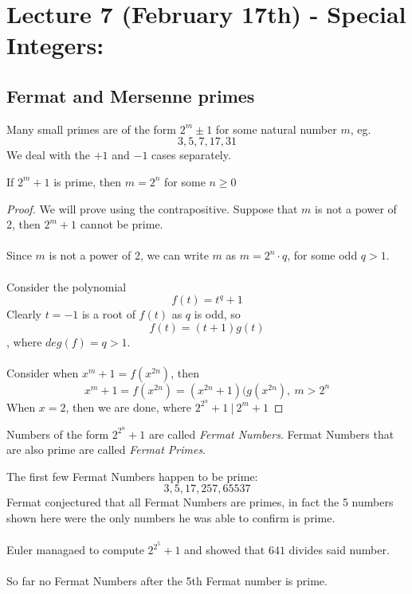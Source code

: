 \section{Lecture 7 (February 17th) - Special Integers:}

\subsection{Fermat and Mersenne primes}
\begin{example}
Many small primes are of the form $2^m \pm 1$ for some natural number $m$, eg.
\[3, 5, 7, 17, 31\]
We deal with the $+1$ and $-1$ cases separately.
\end{example}

\begin{lemma}
If $2^m + 1$ is prime, then $m = 2^n$ for some $n \geq 0$
\end{lemma}

\begin{proof}
We will prove using the contrapositive. Suppose that $m$ is not a power of 2, then $2^m + 1$ cannot be prime.\\\\
Since $m$ is not a power of 2, we can write $m$ as $m = 2^n \cdot q$, for some odd $q > 1$.\\\\
Consider the polynomial
\[f(t) = t^q + 1\]
Clearly $t = -1$ is a root of $f(t)$ as $q$ is odd, so
\[f(t) = (t + 1)g(t)\]
, where $deg(f) = q > 1$.\\\\
Consider when $x^m + 1 = f(x^{2n})$, then
\[x^m + 1 = f(x^{2n}) = (x^{2n} + 1)(g(x^{2n}),\ m > 2^n\]
When $x = 2$, then we are done, where $2^{2^n} + 1\ |\ 2^m + 1$
\end{proof}

\begin{definition}
Numbers of the form $2^{2^n} + 1$ are called \textit{Fermat Numbers}. Fermat Numbers that are also prime are called \textit{Fermat Primes}.
\end{definition}

\begin{example}
The first few Fermat Numbers happen to be prime:
\[3, 5, 17, 257, 65537\]
Fermat conjectured that all Fermat Numbers are primes, in fact the 5 numbers shown here were the only numbers he was able to confirm is prime.\\\\
Euler managaed to compute $2^{2^5} + 1$ and showed that $641$ divides said number.\\\\
So far no Fermat Numbers after the 5th Fermat number is prime.
\end{example}

